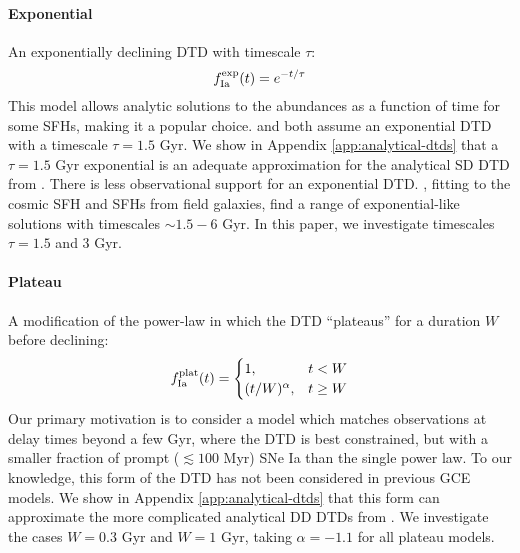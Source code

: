 \documentclass[twocolumn,twocolappendix,linenumbers,trackchanges]{aastex631}
\begin{document}
\paragraph{Exponential} An exponentially declining DTD with timescale $\tau$:
\begin{equation}
    f_{\rm Ia}^{\rm exp}(t) = e^{-t/\tau}
    \label{eq:exponential-dtd}
\end{equation}
This model allows analytic solutions to the abundances as a function of time for some SFHs, making it a popular choice. \citet{Schonrich2009-RadialMixing} and \citet{Weinberg2017-ChemicalEquilibrium} both assume an exponential DTD with a timescale $\tau=1.5$ Gyr. We show in Appendix \ref{app:analytical-dtds} that a $\tau=1.5$ Gyr exponential is an adequate approximation for the analytical SD DTD from \citet{Greggio2005-AnalyticalRates}. 
There is less observational support for an exponential DTD. \citet{Strolger2020-ExponentialDTD}, fitting to the cosmic SFH and SFHs from field galaxies, find a range of exponential-like solutions with timescales $\sim 1.5 - 6$ Gyr.
In this paper, we investigate timescales $\tau=1.5$ and 3 Gyr.

\paragraph{Plateau} A modification of the power-law in which the DTD ``plateaus'' for a duration $W$ before declining:
\begin{equation}
    f_{\rm Ia}^{\rm plat}(t) =
    \begin{cases}
        1, & t < W \\
        (t/W)^\alpha, & t \ge W
    \end{cases}
    \label{eq:plateau-dtd}
\end{equation}
Our primary motivation is to consider a model which matches observations at delay times beyond a few Gyr, where the DTD is best constrained, but with a smaller fraction of prompt ($\lesssim 100$ Myr) SNe Ia than the single power law.
To our knowledge, this form of the DTD has not been considered in previous GCE models. We show in Appendix \ref{app:analytical-dtds} that this form can approximate the more complicated analytical DD DTDs from \citet{Greggio2005-AnalyticalRates}. We investigate the cases $W=0.3$ Gyr and $W=1$ Gyr, taking $\alpha=-1.1$ for all plateau models.
\end{document}
